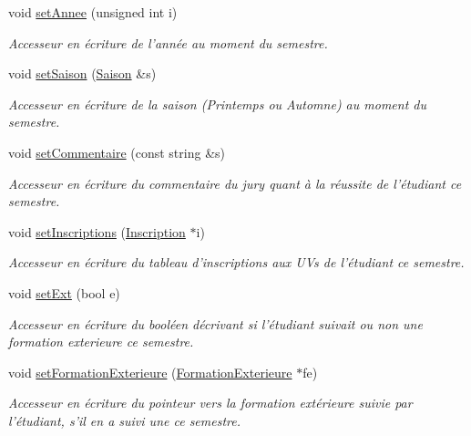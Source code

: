 \begin{DoxyCompactItemize}
void \hyperlink{class_semestre_a7d59af6d380e9c204638fa45bdadae0d}{set\-Annee} (unsigned int i)
\begin{DoxyCompactList}\small\item\em Accesseur en écriture de l'année au moment du semestre. \end{DoxyCompactList}\item 
void \hyperlink{class_semestre_aae3da84ef2e291dca3360330ff0ec990}{set\-Saison} (\hyperlink{_u_t_profiler_8h_a72fcaae0ef529616dd62b747e259d545}{Saison} \&s)
\begin{DoxyCompactList}\small\item\em Accesseur en écriture de la saison (Printemps ou Automne) au moment du semestre. \end{DoxyCompactList}\item 
void \hyperlink{class_semestre_a6120eb48d6cd7363c405332ba5a46d75}{set\-Commentaire} (const string \&s)
\begin{DoxyCompactList}\small\item\em Accesseur en écriture du commentaire du jury quant à la réussite de l'étudiant ce semestre. \end{DoxyCompactList}\item 
void \hyperlink{class_semestre_aa77efecd8daa99ab76cb7acf0e868470}{set\-Inscriptions} (\hyperlink{class_inscription}{Inscription} $\ast$i)
\begin{DoxyCompactList}\small\item\em Accesseur en écriture du tableau d'inscriptions aux U\-Vs de l'étudiant ce semestre. \end{DoxyCompactList}\item 
void \hyperlink{class_semestre_a673fc1c0bf3a9dbaeb784d603ac58eb4}{set\-Ext} (bool e)
\begin{DoxyCompactList}\small\item\em Accesseur en écriture du booléen décrivant si l'étudiant suivait ou non une formation exterieure ce semestre. \end{DoxyCompactList}\item 
void \hyperlink{class_semestre_ad263768ddd1fbb8756340e5593241c75}{set\-Formation\-Exterieure} (\hyperlink{class_formation_exterieure}{Formation\-Exterieure} $\ast$fe)
\begin{DoxyCompactList}\small\item\em Accesseur en écriture du pointeur vers la formation extérieure suivie par l'étudiant, s'il en a suivi une ce semestre. \end{DoxyCompactList}\end{DoxyCompactItemize}


